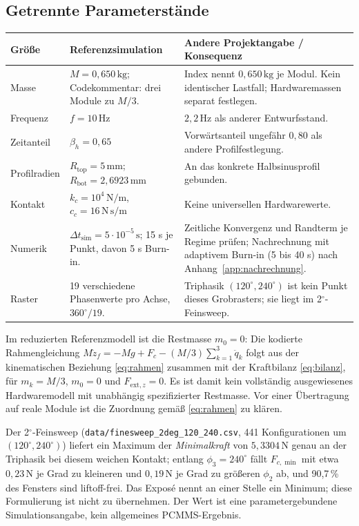 \documentclass[11pt,a4paper]{article}
\begin{document}
\subsection{Getrennte Parameterstände}
\begin{longtable}{@{}L{.24\textwidth}L{.33\textwidth}L{.38\textwidth}@{}}
\toprule\textbf{Größe}&\textbf{Referenzsimulation}&\textbf{Andere Projektangabe / Konsequenz}\\\midrule\endhead
Masse&$M=0{,}650\,\mathrm{kg}$; Codekommentar: drei Module zu $M/3$.&Index nennt $0{,}650\,\mathrm{kg}$ je Modul. Kein identischer Lastfall; Hardwaremassen separat festlegen.\\
Frequenz&$f=10\,\mathrm{Hz}$&$2{,}2\,\mathrm{Hz}$ als anderer Entwurfsstand.\\
Zeitanteil&$\beta_h=0{,}65$&Vorwärtsanteil ungefähr $0{,}80$ als andere Profilfestlegung.\\
Profilradien&$R_{\mathrm{top}}=5\,\mathrm{mm}$; $R_{\mathrm{bot}}=2{,}6923\,\mathrm{mm}$&An das konkrete Halbsinusprofil gebunden.\\
Kontakt&$k_c=10^4\,\mathrm{N/m}$, $c_c=16\,\mathrm{N\,s/m}$&Keine universellen Hardwarewerte.\\
Numerik&$\Delta t_{\mathrm{sim}}=5\cdot10^{-5}\,\mathrm s$; 15 s je Punkt, davon 5 s Burn-in.&Zeitliche Konvergenz und Randterm je Regime prüfen; Nachrechnung mit adaptivem Burn-in (5 bis 40 s) nach Anhang~\ref{app:nachrechnung}.\\
Raster&19 verschiedene Phasenwerte pro Achse, $360^\circ/19$.&Triphasik $(120^\circ,240^\circ)$ ist kein Punkt dieses Grobrasters; sie liegt im 2$^\circ$-Feinsweep.\\
\bottomrule\end{longtable}
Im reduzierten Referenzmodell ist die Restmasse $m_0=0$: Die kodierte Rahmengleichung $M\ddot z_f=-Mg+F_c-(M/3)\sum_{k=1}^{3}\ddot q_k$ folgt aus der kinematischen Beziehung \eqref{eq:rahmen} zusammen mit der Kraftbilanz \eqref{eq:bilanz}, für $m_k=M/3$, $m_0=0$ und $F_{\mathrm{ext},z}=0$. Es ist damit kein vollständig ausgewiesenes Hardwaremodell mit unabhängig spezifizierter Restmasse. Vor einer Übertragung auf reale Module ist die Zuordnung gemäß \eqref{eq:rahmen} zu klären.

Der 2$^\circ$-Feinsweep (\texttt{data/finesweep\_2deg\_120\_240.csv}, 441 Konfigurationen um $(120^\circ,240^\circ)$) liefert ein Maximum der \emph{Minimalkraft} von $5{,}3304\,\mathrm N$ genau an der Triphasik bei diesem weichen Kontakt; entlang $\phi_3=240^\circ$ fällt $F_{c,\min}$ mit etwa $0{,}23\,\mathrm N$ je Grad zu kleineren und $0{,}19\,\mathrm N$ je Grad zu größeren $\phi_2$ ab, und 90{,}7\,\% des Fensters sind liftoff-frei. Das Exposé nennt an einer Stelle ein Minimum; diese Formulierung ist nicht zu übernehmen. Der Wert ist eine parametergebundene Simulationsangabe, kein allgemeines PCMMS-Ergebnis.
\end{document}
